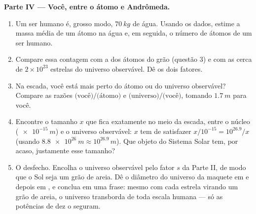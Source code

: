 \begin{problem}
\medskip
\noindent\textbf{Parte IV --- Você, entre o átomo e Andrômeda.}
\begin{enumerate}[resume]
  \item Um ser humano é, grosso modo, $\qty{70}{kg}$ de água. Usando os
        dados, estime a massa média de um átomo na água e, em seguida, o
        número de átomos de um ser humano.
  \item Compare essa contagem com a dos átomos do grão (questão 3) e com
        as cerca de $2\times10^{23}$ estrelas do universo observável. Dê
        os dois fatores.
  \item Na escada, você está mais perto do átomo ou do universo
        observável? Compare as razões $\text{(você)}/\text{(átomo)}$ e
        $\text{(universo)}/\text{(você)}$, tomando $\qty{1.7}{m}$ para
        você.
  \item Encontre o tamanho $x$ que fica exatamente no meio da escada,
        entre o núcleo ($\qty{e-15}{m}$) e o universo observável: $x$
        tem de satisfazer $x / 10^{-15} = 10^{26.9} / x$ (usando
        $\qty{8.8e26}{m} \approx 10^{26.9}\,\unit{m}$). Que objeto do
        Sistema Solar tem, por acaso, justamente esse tamanho?
  \item O desfecho. Encolha o universo observável pelo fator $s$ da
        Parte II, de modo que o Sol seja um grão de areia. Dê o diâmetro
        do universo da maquete em  e depois em , e conclua em uma frase: mesmo com cada estrela
        virando um grão de areia, o universo transborda de toda escala
        humana --- só as potências de dez o seguram.
\end{enumerate}
\end{problem}

